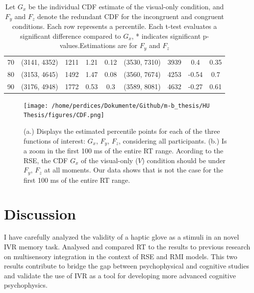 \documentclass[12pt,oneside,openright]{report}
\begin{document}
\begin{table}[!ht]
{\begin{tabular}{ccccccccc}
    70 & (3141, 4352) & 1211 & 1.21 & 0.12 & (3530, 7310) & 3939 & 0.4 & 0.35 \\
    80 & (3153, 4645) & 1492 & 1.47 & 0.08 & (3560, 7674) & 4253 & -0.54 & 0.7 \\
    90 & (3176, 4948) & 1772 & 0.53 & 0.3 & (3589, 8081) & 4632 & -0.27 & 0.61 \\ \hline
    \end{tabular}}
    \caption{Let $G_x$ be the individual CDF estimate of the visual-only condition, and $F_y$ and $F_z$ denote the redundant CDF for the incongruent and congruent conditions. Each row represents a percentile. Each t-test evaluates a significant difference compared to $G_x$, * indicates significant p-values.Estimations are for $F_y$ and $F_z$}
    \label{tab:response-time-range}
\end{table}


\begin{figure}[!ht]
    \centering
    \texttt{[image: /home/perdices/Dokumente/Github/m-b\_thesis/HU Thesis/figures/CDF.png]}
    \caption{ (a.) Displays the estimated percentile points for each of the three functions of interest: $G_x$, $F_y$, $F_z$, considering all participants. (b.) Is a zoom in the first 100 ms of the entire RT range. Acording to the RSE, the CDF $G_x$ of the visual-only ($V$) condition should be under $F_y$, $F_z$ at all moments. Our data shows that is not the case for the first 100 ms of the entire RT range.}
    \label{fig:CDF}
\end{figure}


\section*{Discussion}

I have carefully analyzed the validity of a haptic glove as a stimuli in an novel IVR memory task. Analysed and compared RT to the results to previous research on multisensory integration in the context of RSE and RMI models. This two results contribute to bridge the gap between psychophysical and cognitive studies and validate the use of IVR as a tool for developing more advanced cognitive psychophysics.
\end{document}
